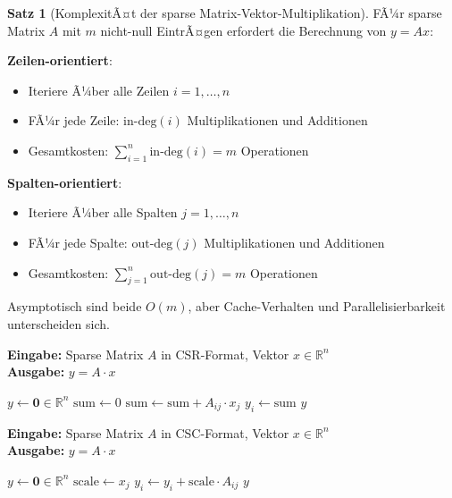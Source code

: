 ﻿\documentclass[a4paper,12pt]{report}
\theoremstyle{definition}
\newtheorem{satz}{Satz}
\begin{document}
	\begin{satz}[KomplexitÃ¤t der sparse Matrix-Vektor-Multiplikation]
		FÃ¼r sparse Matrix $A$ mit $m$ nicht-null EintrÃ¤gen erfordert die Berechnung von $y = Ax$:
		
		\textbf{Zeilen-orientiert}:
		\begin{itemize}
			\item Iteriere Ã¼ber alle Zeilen $i = 1,\ldots,n$
			\item FÃ¼r jede Zeile: $\text{in-deg}(i)$ Multiplikationen und Additionen
			\item Gesamtkosten: $\sum_{i=1}^n \text{in-deg}(i) = m$ Operationen
		\end{itemize}
		
		\textbf{Spalten-orientiert}:
		\begin{itemize}
			\item Iteriere Ã¼ber alle Spalten $j = 1,\ldots,n$
			\item FÃ¼r jede Spalte: $\text{out-deg}(j)$ Multiplikationen und Additionen
			\item Gesamtkosten: $\sum_{j=1}^n \text{out-deg}(j) = m$ Operationen
		\end{itemize}
		
		Asymptotisch sind beide $O(m)$, aber Cache-Verhalten und Parallelisierbarkeit unterscheiden sich.
	\end{satz}
	
	\begin{algorithm}[H]
		\caption{Zeilen-orientierte sparse Matrix-Vektor-Multiplikation}
		\label{alg:row-matvec}
		\textbf{Eingabe:} Sparse Matrix $A$ in CSR-Format, Vektor $x \in \mathbb{R}^n$ \\
		\textbf{Ausgabe:} $y = A \cdot x$
		\begin{algorithmic}[1]
			\State $y \gets \mathbf{0} \in \mathbb{R}^n$
			\State $\text{sum} \gets 0$
			\State $\text{sum} \gets \text{sum} + A_{ij} \cdot x_j$
			\EndFor
			\State $y_i \gets \text{sum}$
			\EndFor
			\State \Return $y$
		\end{algorithmic}
	\end{algorithm}
	
	\begin{algorithm}[H]
		\caption{Spalten-orientierte sparse Matrix-Vektor-Multiplikation}
		\label{alg:column-matvec-detailed}
		\textbf{Eingabe:} Sparse Matrix $A$ in CSC-Format, Vektor $x \in \mathbb{R}^n$ \\
		\textbf{Ausgabe:} $y = A \cdot x$
		\begin{algorithmic}[1]
			\State $y \gets \mathbf{0} \in \mathbb{R}^n$
			\State $\text{scale} \gets x_j$
			\State $y_i \gets y_i + \text{scale} \cdot A_{ij}$
			\EndFor
			\EndIf
			\EndFor
			\State \Return $y$
		\end{algorithmic}
	\end{algorithm}
	
\end{document}

